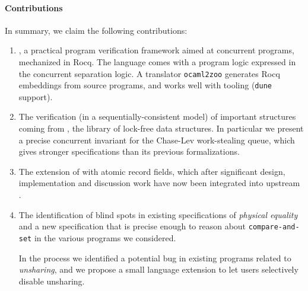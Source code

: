 \paragraph{Contributions} In summary, we claim the following contributions:
\begin{enumerate}
\item \Zoo, a practical program verification framework aimed at
  concurrent \OCaml programs, mechanized in Rocq. The language
  \ZooLang comes with a program logic expressed in the \Iris
  concurrent separation logic. A translator \texttt{ocaml2zoo}
  generates Rocq embeddings from source \OCaml programs, and works
  well with \OCaml tooling (\texttt{dune} support).

\item The verification (in a sequentially-consistent model) of
  important structures coming from \Saturn, the \OCamlFive library of
  lock-free data structures. In particular we present a precise
  concurrent invariant for the Chase-Lev work-stealing queue, which gives
  stronger specifications than its previous formalizations.


\item The extension of \OCaml with atomic record fields, which after
  significant design, implementation and discussion work have now been
  integrated into upstream \OCaml.

\item The identification of blind spots in existing specifications of
  \emph{physical equality} and a new specification that is precise
  enough to reason about \texttt{compare-and-set} in the various
  programs we considered.

  In the process we identified a potential bug in existing \OCaml
  programs related to \emph{unsharing}, and we propose a small
  language extension to let users selectively disable unsharing.
\end{enumerate}

